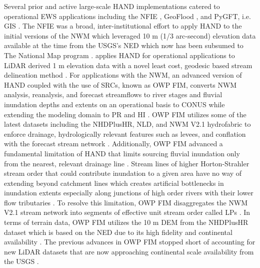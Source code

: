 \documentclass[preprint,review,12pt]{dependencies/elsarticle}
\begin{document}
Several prior and active large-scale \ac{HAND} implementations catered to operational \ac{EWS} applications including the \ac{NFIE} \citep{maidment2017conceptual,liu2016cybergis,liu2018cybergis}, GeoFlood \citep{zheng2018geoflood}, and \ac{PyGFT}, i.e. \ac{GIS} \citep{petrochenkov2020pygft,verdin2016software}.
The \ac{NFIE} was a broad, inter-institutional effort to apply HAND to the initial versions of the \ac{NWM} which leveraged 10 \ac{m} (1/3 arc-second) elevation data available at the time \citep{maidment2017conceptual,liu2016cybergis,liu2018cybergis} from the \ac{USGS}'s \ac{NED} \citep{gesch2009national,gesch2014accuracy} which now has been subsumed \citep{arundel2018assimilation} to The National Map program \citep{gesch2009national,archuleta2017national}.
\citet{zheng2018geoflood} applies HAND for operational applications to \ac{LiDAR} derived 1 \ac{m} elevation data with a novel least cost, geodesic based stream delineation method \citep{passalacqua2010geometric,passalacqua2012automatic,zheng2018geoflood}.
For applications with the \ac{NWM}, an advanced version of \ac{HAND} coupled with the use of \acp{SRC}, known as \ac{OWP} \ac{FIM}, converts \ac{NWM} analysis, reanalysis, and forecast streamflows to river stages and fluvial inundation depths and extents on an operational basis to \ac{CONUS} while extending the modeling domain to \ac{PR} and \ac{HI} \citep{aristizabal2022reducing,inundationMapping2022}.
\ac{OWP} \ac{FIM} utilizes some of the latest datasets including the \ac{NHDPlusHR}, \ac{NLD}, and \ac{NWM} \ac{V2.1} hydrofabric to enforce drainage, hydrologically relevant features such as levees, and conflation with the forecast stream network \citep{aristizabal2022reducing,inundationMapping2022}.
Additionally, \ac{OWP} \ac{FIM} advanced a fundamental limitation of \ac{HAND} that limits sourcing fluvial inundation only from the nearest, relevant drainage line \citep{mcgehee2016modified,aristizabal2022reducing,zhang2018comparative,li2022comparative,zheng2018geoflood,zheng2018river,nobre2016hand}.
Stream lines of higher Horton-Strahler stream order that could contribute inundation to a given area have no way of extending beyond catchment lines which creates artificial bottlenecks in inundation extents especially along junctions of high order rivers with their lower flow tributaries \citep{aristizabal2022reducing,mcgehee2016modified}.
To resolve this limitation, \ac{OWP} \ac{FIM} disaggregates the \ac{NWM} \ac{V2.1} stream network into segments of effective unit stream order called \acp{LP} \citep{aristizabal2022reducing}.
In terms of terrain data, \ac{OWP} \ac{FIM} utilizes the 10 \ac{m} \ac{DEM} from the \ac{NHDPlusHR} dataset which is based on the \ac{NED} due to its high fidelity and continental availability \citep{aristizabal2022reducing,moore2019user}.
The previous advances in \ac{OWP} \ac{FIM} stopped short of accounting for new \ac{LiDAR} datasets that are now approaching continental scale availability from the \ac{USGS} \citep{aristizabal2022reducing}.
\end{document}
